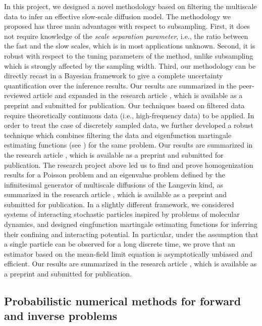 \documentclass[10pt]{article}
\begin{document}
In this project, we designed a novel methodology based on filtering the multiscale data to infer an effective slow-scale diffusion model. The methodology we proposed has three main advantages with respect to subsampling. First, it does not require knowledge of the \textit{scale separation parameter}, i.e., the ratio between the fast and the slow scales, which is in most applications unknown. Second, it is robust with respect to the tuning parameters of the method, unlike subsampling which is strongly affected by the sampling width. Third, our methodology can be directly recast in a Bayesian framework to give a complete uncertainty quantification over the inference results. Our results are summarized in the peer-reviewed article \cite{AGP21} and expanded in the research article \cite{GaZ21}, which is available as a preprint and submitted for publication. Our techniques based on filtered data require theoretically continuous data (i.e., high-frequency data) to be applied. In order to treat the case of discretely sampled data, we further developed a robust technique which combines filtering the data and eigenfunction martingale estimating functions (see \cite{KeS99,CrV06,CrV06b,CrV11}) for the same problem. Our results are summarized in the research article \cite{APZ21}, which is available as a preprint and submitted for publication. The research project above led us to find and prove homogenization results for a Poisson problem and an eigenvalue problem defined by the infinitesimal generator of multiscale diffusions of the Langevin kind, as summarized in the research article \cite{Zan21}, which is available as a preprint and submitted for publication. In a slightly different framework, we considered systems of interacting stochastic particles inspired by problems of molecular dynamics, and designed eingfunction martingale estimating functions for inferring their confining and interacting potential. In particular, under the assumption that a single particle can be observed for a long discrete time, we prove that an estimator based on the mean-field limit equation is asymptotically unbiased and efficient. Our results are summarized in the research article \cite{PaZ21}, which is available as a preprint and submitted for publication.

\subsection{Probabilistic numerical methods for forward and inverse problems}\label{sec:Giacomo}
\end{document}
